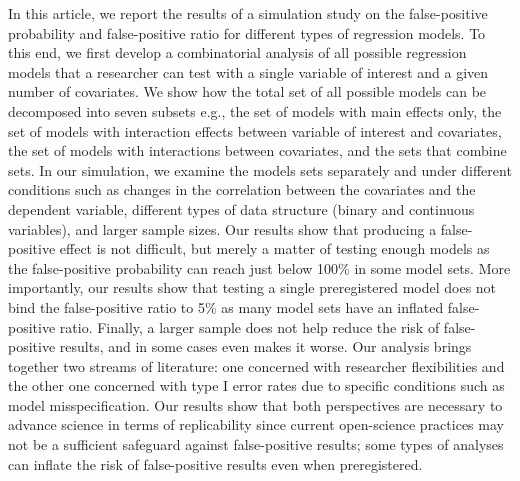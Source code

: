 In this article, we report the results of a simulation study on the false-positive probability and false-positive ratio for different types of regression models. 
To this end, we first develop a combinatorial analysis of all possible regression models that a researcher can test with a single variable of interest and a given number of covariates. We show how the total set of all possible models can be decomposed into seven subsets e.g., the set of models with main effects only, the set of models with interaction effects between variable of interest and covariates, the set of models with interactions between covariates, and the sets that combine sets.  
In our simulation, we examine the models sets separately and under different conditions such as changes in the correlation between the covariates and the dependent variable, different types of data structure (binary and continuous variables), and larger sample sizes.
Our results show that producing a false-positive effect is not difficult, but merely a matter of testing enough models as the false-positive probability can reach just below 100\% in some model sets. More importantly, our results show that testing a single preregistered model does not bind the false-positive ratio to 5\% as many model sets have an inflated false-positive ratio. Finally, a larger sample does not help reduce the risk of false-positive results, and in some cases even makes it worse.
Our analysis brings together two streams of literature: one concerned with researcher flexibilities and the other one concerned with type I error rates due to specific conditions such as model misspecification. Our results show that both perspectives are necessary to advance science in terms of replicability since current open-science practices may not be a sufficient safeguard against false-positive results; some types of analyses can inflate the risk of false-positive results even when preregistered. 
 \\ 
 

